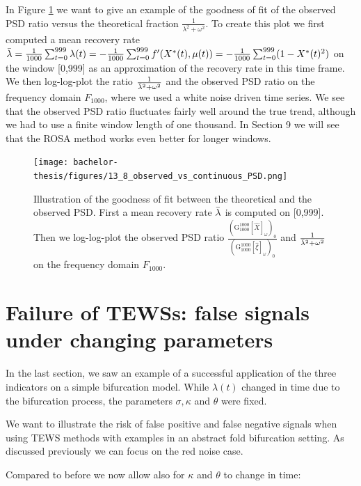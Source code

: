 \documentclass[%
thesis=student,%
coverpage=false,%
titlepage=false,%
headmarks=true, %
english,%
font=libertine, %
math=newpxtx, %
BCOR=5mm,%
coverBCOR=11mm%
]{tumbook}
\begin{document}
In Figure \ref{observed_vs_continuous_PSD} we want to give an example of the goodness of fit of the observed PSD ratio versus the theoretical fraction $\frac{1}{\lambda^2 + \omega^2}$. To create this plot we first computed a mean recovery rate $\Bar{\lambda} = \frac{1}{1000}\sum_{t=0}^{999}\lambda(t) = -\frac{1}{1000}\sum_{t=0}^{999}f'(X^{*}(t),\mu(t)) = -\frac{1}{1000}\sum_{t=0}^{999}(1-X^{*}(t)^2)$ on the window [0,999] as an approximation of the recovery rate in this time frame. We then log-log-plot the ratio $\frac{1}{\Bar{\lambda}^2 + \omega^2}$ and the observed PSD ratio on the frequency domain $F_{1000}$, where we used a white noise driven time series. We see that the observed PSD ratio fluctuates fairly well around the true trend, although we had to use a finite window length of one thousand.
In Section 9 we will see that the ROSA method works even better for longer windows.



\begin{figure}
    \centering
    \texttt{[image: bachelor-thesis/figures/13\_8\_observed\_vs\_continuous\_PSD.png]}
    \caption{Illustration of the goodness of fit between the theoretical and the observed PSD.  First a mean recovery rate $\Bar{\lambda}$ is computed on [0,999]. Then we log-log-plot the observed PSD ratio $\frac{(\mathrm{G}_{1000}^{1000}[\widehat{X}]_{\omega})_{0}}{(\mathrm{G}_{1000}^{1000}[\widehat{\xi}]_{\omega})_{0}}$ and $\frac{1}{\Bar{\lambda}^2 + \omega^2}$ on the frequency domain $F_{1000}$.}
    \label{observed_vs_continuous_PSD}
\end{figure}

\chapter{Failure of TEWSs: false signals  under changing parameters}

In the last section, we saw an example of a successful application of the three indicators on a simple bifurcation model. While $\lambda(t)$ changed in time due to the bifurcation process, the parameters $\sigma, \kappa$ and $\theta$ were fixed. 

We want to illustrate the risk of false positive and false negative signals when using TEWS methods with examples in an abstract fold bifurcation setting. As discussed previously we can focus on the red noise case.

Compared to before we now allow also for $\kappa$ and $\theta$ to change in time:
\end{document}
